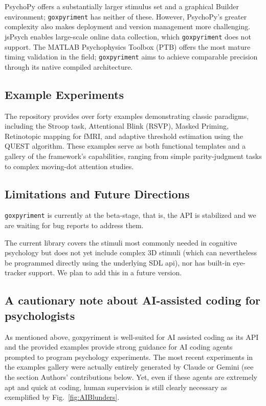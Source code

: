 \documentclass[jou,a4paper]{apa7}
\begin{document}
PsychoPy offers a substantially larger stimulus set and a graphical
Builder environment; \texttt{goxpyriment} has neither of these. However,
PsychoPy's greater complexity also makes deployment and version management more
challenging. jsPsych enables large-scale online data collection, which
\texttt{goxpyriment} does not support. The MATLAB Psychophysics Toolbox (PTB)
offers the most mature timing validation in the field; \texttt{goxpyriment} aims
to achieve comparable precision through its native compiled architecture.

\subsection{Example Experiments}\label{example-experiments}

The repository provides over forty examples demonstrating classic paradigms,
including the Stroop task, Attentional Blink (RSVP), Masked Priming,
Retinotopic mapping for fMRI, and adaptive threshold estimation using the QUEST
algorithm. These examples serve as both functional templates and a gallery of
the framework's capabilities, ranging from simple parity-judgment tasks to
complex moving-dot attention studies.



\subsection{Limitations and Future Directions}\label{limitations-and-future-directions}

\texttt{goxpyriment} is currently at the beta-stage, that is, the API is stabilized and we are waiting for bug reports to address them.

The current library covers the stimuli most commonly needed in cognitive psychology but does not yet
include complex 3D stimuli (which can nevertheless be programmed directly using the underlying SDL api), nor has built-in eye-tracker support. We plan to add this in a future version.

\subsection{A cautionary note about AI-assisted coding for psychologists}

As mentioned above, goxpyriment is well-suited for AI assisted coding as its API and the provided examples provide strong guidance for AI coding agents prompted to program psychology experiments. The most recent experiments in the examples gallery were actually entirely generated by Claude or Gemini (see the section Authors' contributions below. Yet, even if these agents are extremely apt and quick at coding, human supervision is still clearly necessary as exemplified by Fig.~\ref{fig:AIBlunders}.
\end{document}
